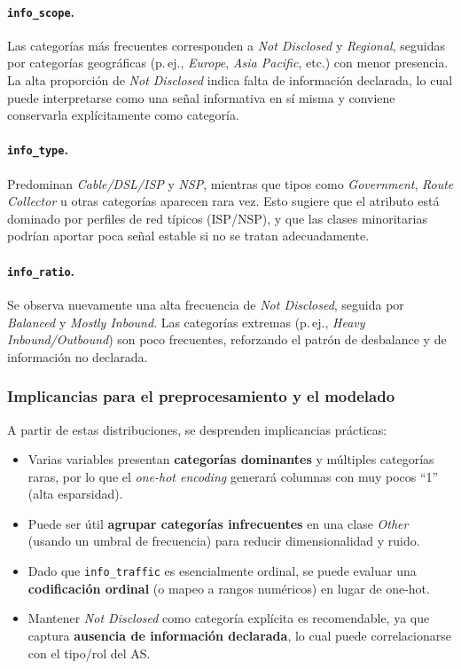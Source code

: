\paragraph{\texttt{info\_scope}.}
Las categorías más frecuentes corresponden a \emph{Not Disclosed} y \emph{Regional}, seguidas por categorías geográficas (p.\,ej., \emph{Europe}, \emph{Asia Pacific}, etc.) con menor presencia. La alta proporción de \emph{Not Disclosed} indica falta de información declarada, lo cual puede interpretarse como una señal informativa en sí misma y conviene conservarla explícitamente como categoría.

\paragraph{\texttt{info\_type}.}
Predominan \emph{Cable/DSL/ISP} y \emph{NSP}, mientras que tipos como \emph{Government}, \emph{Route Collector} u otras categorías aparecen rara vez. Esto sugiere que el atributo está dominado por perfiles de red típicos (ISP/NSP), y que las clases minoritarias podrían aportar poca señal estable si no se tratan adecuadamente.

\paragraph{\texttt{info\_ratio}.}
Se observa nuevamente una alta frecuencia de \emph{Not Disclosed}, seguida por \emph{Balanced} y \emph{Mostly Inbound}. Las categorías extremas (p.\,ej., \emph{Heavy Inbound/Outbound}) son poco frecuentes, reforzando el patrón de desbalance y de información no declarada.

\subsubsection{Implicancias para el preprocesamiento y el modelado}
A partir de estas distribuciones, se desprenden implicancias prácticas:
\begin{itemize}
    \item Varias variables presentan \textbf{categorías dominantes} y múltiples categorías raras, por lo que el \emph{one-hot encoding} generará columnas con muy pocos ``1'' (alta esparsidad).
    \item Puede ser útil \textbf{agrupar categorías infrecuentes} en una clase \emph{Other} (usando un umbral de frecuencia) para reducir dimensionalidad y ruido.
    \item Dado que \texttt{info\_traffic} es esencialmente ordinal, se puede evaluar una \textbf{codificación ordinal} (o mapeo a rangos numéricos) en lugar de one-hot.
    \item Mantener \emph{Not Disclosed} como categoría explícita es recomendable, ya que captura \textbf{ausencia de información declarada}, lo cual puede correlacionarse con el tipo/rol del AS.
\end{itemize}




